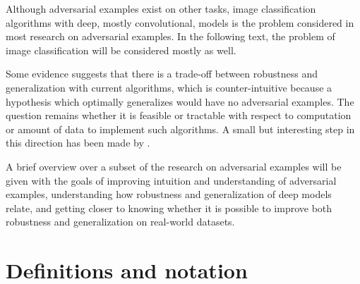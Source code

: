 \documentclass[conference,compsoc]{IEEEtran}
\begin{document}
Although adversarial examples exist on other tasks, image classification algorithms with deep, mostly convolutional, models is the problem considered in most research on adversarial examples. In the following text, the problem of image classification will be considered mostly as well.

Some evidence suggests that there is a trade-off between robustness and generalization \citep{Tsipras:2018:RMBOA,Madry:2017:TDLMRAA,Su:2018:IRTCOACSRDICM} with current algorithms, which is counter-intuitive because a hypothesis which optimally generalizes would have no adversarial examples. The question remains whether it is feasible or tractable with respect to computation or amount of data to implement such algorithms. A small but interesting step in this direction has been made by \citep{Stutz:2018:DARG}.

A brief overview over a subset of the research on adversarial examples will be given with the goals of improving intuition and understanding of adversarial examples, understanding how robustness and generalization of deep models relate, and getting closer to knowing whether it is possible to improve both robustness and generalization on real-world datasets. 


\section{Definitions and notation}
\end{document}
